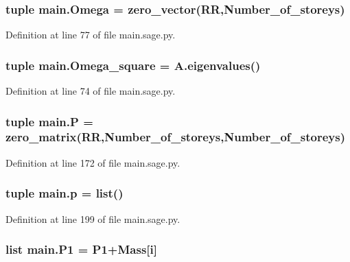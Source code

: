 \subsubsection[{Omega}]{\setlength{\rightskip}{0pt plus 5cm}tuple main.\+Omega = zero\+\_\+vector(R\+R,Number\+\_\+of\+\_\+storeys)}\label{a00039_a0cc58897a39912c706ab64fd26e0d62e}


Definition at line 77 of file main.\+sage.\+py.

\hypertarget{a00039_abc7a524ddae98db1c2f4cf8535104feb}{}
\subsubsection[{Omega\+\_\+square}]{\setlength{\rightskip}{0pt plus 5cm}tuple main.\+Omega\+\_\+square = A.\+eigenvalues()}\label{a00039_abc7a524ddae98db1c2f4cf8535104feb}


Definition at line 74 of file main.\+sage.\+py.

\hypertarget{a00039_ad403610ba53df02f8dfaff8dd64227b3}{}
\subsubsection[{P}]{\setlength{\rightskip}{0pt plus 5cm}tuple main.\+P = zero\+\_\+matrix(R\+R,Number\+\_\+of\+\_\+storeys,Number\+\_\+of\+\_\+storeys)}\label{a00039_ad403610ba53df02f8dfaff8dd64227b3}


Definition at line 172 of file main.\+sage.\+py.

\hypertarget{a00039_ab31fc16b432d2248a6c76c6a18d741d0}{}
\subsubsection[{p}]{\setlength{\rightskip}{0pt plus 5cm}tuple main.\+p = list()}\label{a00039_ab31fc16b432d2248a6c76c6a18d741d0}


Definition at line 199 of file main.\+sage.\+py.

\hypertarget{a00039_add7e0394c94a2e2115aff785eb6995e3}{}
\subsubsection[{P1}]{\setlength{\rightskip}{0pt plus 5cm}list main.\+P1 = P1+Mass\mbox{[}{\bf i}\mbox{]}}\label{a00039_add7e0394c94a2e2115aff785eb6995e3}


